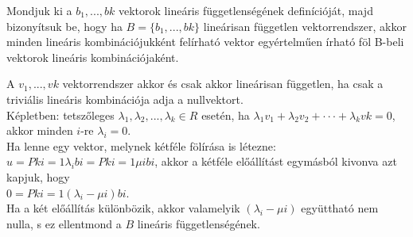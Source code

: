\begin{frame}
  \begin{tcolorbox}[title={1. (4p)}]
    Mondjuk ki a $b_1,...,bk$ vektorok lineáris függetlenségének definícióját, majd bizonyítsuk be, hogy ha $B = \{b_1,...,bk\}$ lineárisan független vektorrendszer, akkor minden lineáris kombinációjukként felírható vektor egyértelműen írható föl B-beli vektorok lineáris kombinációjaként.
  \tcblower
  
    A $v_1,...,vk$ vektorrendszer akkor és csak akkor lineárisan független, ha csak a triviális lineáris kombinációja adja a nullvektort.\\

    Képletben: tetszőleges ${\lambda}_1,{\lambda}_2,...,{\lambda}_k \in R$ esetén, ha ${\lambda}_1v_1 + {\lambda}_2v_2 +  \cdot  \cdot  \cdot  + {\lambda}_kvk = 0$, akkor minden $i$-re ${\lambda}_i = 0$.\\

    Ha lenne egy vektor, melynek kétféle fölírása is létezne: $u = Pk i=1 {\lambda}_ibi = Pk i=1 {\mu}ibi$, akkor a kétféle előállítást egymásból kivonva azt kapjuk, hogy\\

    $0 = Pk i=1({\lambda}_i -{\mu}i)bi$.\\

    Ha a két előállítás különbözik, akkor valamelyik $({\lambda}_i-{\mu}i)$ együttható nem nulla, s ez ellentmond a $B$ lineáris függetlenségének.
  \end{tcolorbox}
\end{frame}



